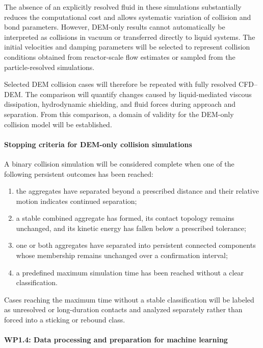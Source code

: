 \documentclass[11pt,a4paper,twoside]{scrartcl}
\begin{document}
The absence of an explicitly resolved fluid in these simulations substantially reduces the computational cost and allows systematic variation of collision and bond parameters. However, DEM-only results cannot automatically be interpreted as collisions in vacuum or transferred directly to liquid systems. The initial velocities and damping parameters will be selected to represent collision conditions obtained from reactor-scale flow estimates or sampled from the particle-resolved simulations.

Selected DEM collision cases will therefore be repeated with fully resolved CFD--DEM. The comparison will quantify changes caused by liquid-mediated viscous dissipation, hydrodynamic shielding, and fluid forces during approach and separation. From this comparison, a domain of validity for the DEM-only collision model will be established.

\paragraph{Stopping criteria for DEM-only collision simulations}

A binary collision simulation will be considered complete when one of the following persistent outcomes has been reached:

\begin{enumerate}
	\item the aggregates have separated beyond a prescribed distance and their relative motion indicates continued separation;
	
	\item a stable combined aggregate has formed, its contact topology remains unchanged, and its kinetic energy has fallen below a prescribed tolerance;
	
	\item one or both aggregates have separated into persistent connected components whose membership remains unchanged over a confirmation interval;
	
	\item a predefined maximum simulation time has been reached without a clear classification.
\end{enumerate}

Cases reaching the maximum time without a stable classification will be labeled as unresolved or long-duration contacts and analyzed separately rather than forced into a sticking or rebound class.

\paragraph{WP1.4: Data processing and preparation for machine learning}
\end{document}
